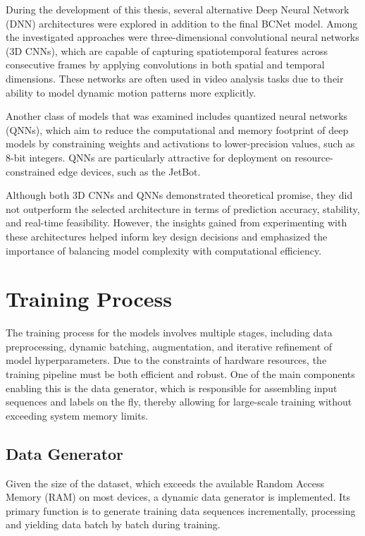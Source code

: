 During the development of this thesis, several alternative Deep Neural Network (DNN) architectures were explored in addition to the final BCNet model. Among the investigated approaches were three-dimensional convolutional neural networks (3D CNNs), which are capable of capturing spatiotemporal features across consecutive frames by applying convolutions in both spatial and temporal dimensions. These networks are often used in video analysis tasks due to their ability to model dynamic motion patterns more explicitly.

Another class of models that was examined includes quantized neural networks (QNNs), which aim to reduce the computational and memory footprint of deep models by constraining weights and activations to lower-precision values, such as 8-bit integers. QNNs are particularly attractive for deployment on resource-constrained edge devices, such as the JetBot.

Although both 3D CNNs and QNNs demonstrated theoretical promise, they did not outperform the selected architecture in terms of prediction accuracy, stability, and real-time feasibility. However, the insights gained from experimenting with these architectures helped inform key design decisions and emphasized the importance of balancing model complexity with computational efficiency.

\section{Training Process}

The training process for the models involves multiple stages, including data preprocessing, dynamic batching, augmentation, and iterative refinement of model hyperparameters. Due to the constraints of hardware resources, the training pipeline must be both efficient and robust. One of the main components enabling this is the data generator, which is responsible for assembling input sequences and labels on the fly, thereby allowing for large-scale training without exceeding system memory limits.

\subsection{Data Generator}

Given the size of the dataset, which exceeds the available Random Access Memory (RAM) on most devices, a dynamic data generator is implemented. Its primary function is to generate training data sequences incrementally, processing and yielding data batch by batch during training.

